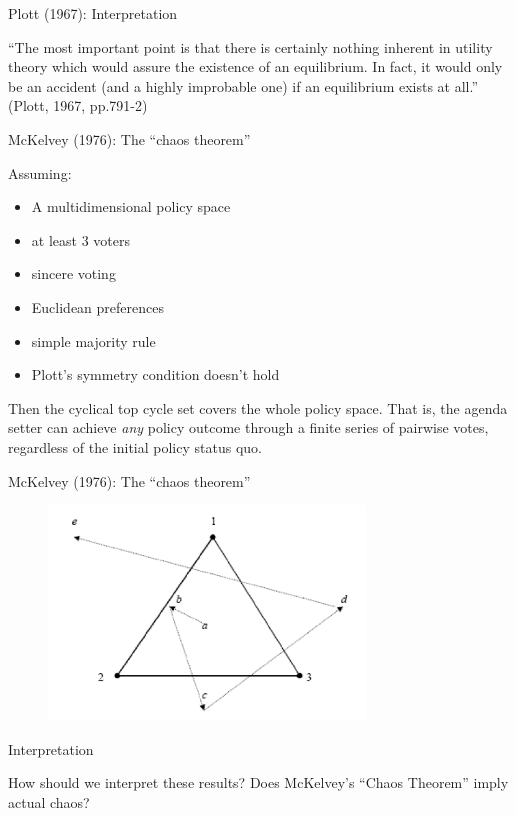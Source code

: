 \documentclass[11pt,aspectratio=169]{beamer}
\begin{document}
\begin{frame}{Plott (1967): Interpretation}

\Large

``The most important point is that there is certainly nothing inherent in utility theory which would assure the existence of an equilibrium. In fact, it would only be an accident (and a highly improbable one) if an equilibrium exists at all.'' \newline (Plott, 1967, pp.791-2)

\end{frame}
\begin{frame}{McKelvey (1976): The ``chaos theorem''}

Assuming:
\begin{itemize}
\item A multidimensional policy space
\item at least 3 voters
\item sincere voting
\item Euclidean preferences
\item simple majority rule
\item Plott's symmetry condition doesn't hold
\end{itemize}

Then the cyclical top cycle set covers the whole
policy space. That is, the agenda setter can achieve \textit{any} policy outcome through a finite series of pairwise votes, regardless of the initial policy status quo. 



\end{frame}
\begin{frame}{McKelvey (1976): The ``chaos theorem''}

\begin{figure}
\includegraphics[width=0.75\textwidth]{mckelvey.png}
\end{figure}

\end{frame}
\begin{frame}{Interpretation}

\Large

\begin{tcolorbox}
How should we interpret these results? Does McKelvey's ``Chaos Theorem'' imply actual chaos? 
\end{tcolorbox}

\end{frame}
\end{document}
